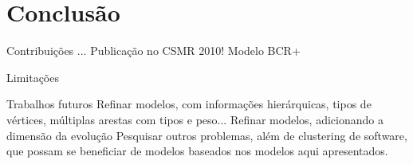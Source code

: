 

\chapter{Conclusão}

Contribuições
  ...
  Publicação no CSMR 2010!
  Modelo BCR+

Limitações

Trabalhos futuros
  Refinar modelos, com informações hierárquicas, tipos de vértices, múltiplas arestas com tipos e peso...
  Refinar modelos, adicionando a dimensão da evolução
  Pesquisar outros problemas, além de clustering de software, que possam se beneficiar de modelos baseados nos modelos aqui apresentados.
